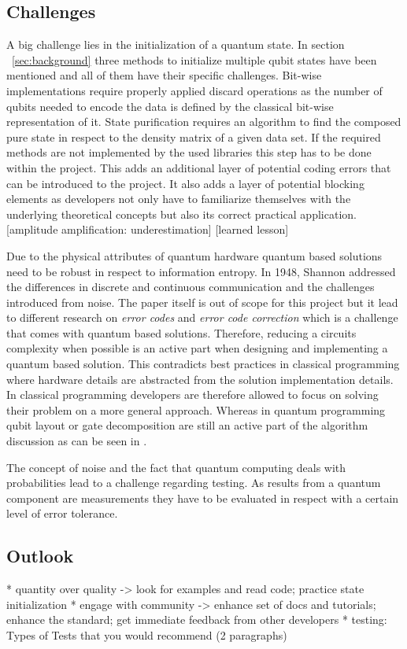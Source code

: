 
\subsection{Challenges}
\label{subsec:challenges}
A big challenge lies in the initialization of a quantum state. In section ~\ref{sec:background} three methods to initialize multiple qubit states have been mentioned and all of them have their specific challenges. Bit-wise implementations require properly applied discard operations as the number of qubits needed to encode the data is defined by the classical bit-wise representation of it. State purification requires an algorithm to find the composed pure state in respect to the density matrix of a given data set. If the required methods are not implemented by the used libraries this step has to be done within the project. This adds an additional layer of potential coding errors that can be introduced to the project. It also adds a layer of potential blocking elements as developers not only have to familiarize themselves with the underlying theoretical concepts but also its correct practical application. [amplitude amplification: underestimation]
[learned lesson]

Due to the physical attributes of quantum hardware quantum based solutions need to be robust in respect to information entropy. In 1948, Shannon addressed the differences in discrete and continuous communication and the challenges introduced from noise. The paper itself is out of scope for this project but it lead to different research on \emph{error codes} and \emph{error code correction} which is a challenge that comes with quantum based solutions. Therefore, reducing a circuits complexity when possible is an active part when designing and implementing a quantum based solution. This contradicts best practices in classical programming where hardware details are abstracted from the solution implementation details. In classical programming developers are therefore allowed to focus on solving their problem on a more general approach. Whereas in quantum programming qubit layout or gate decomposition are still an active part of the algorithm discussion as can be seen in \cite{Lokho_2020}.

The concept of noise and the fact that quantum computing deals with probabilities lead to a challenge regarding testing. As results from a quantum component are measurements they have to be evaluated in respect with a certain level of error tolerance. 

\subsection{Outlook}
\label{subsec:outlook}
* quantity over quality -> look for examples and read code; practice state initialization
* engage with community -> enhance set of docs and tutorials; enhance the standard; get immediate feedback from other developers
* testing: Types of Tests that you would recommend (2 paragraphs)
